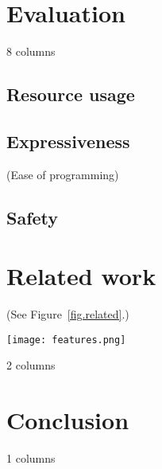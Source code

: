 \documentclass[10pt]{sensys-proc}
\newcommand{\CEU}{\textsc{C\'{e}u}\xspace}
\begin{document}
\newpage
\section{Evaluation}
\label{sec.eval}

8 columns

\subsection{Resource usage}


\subsection{Expressiveness} (Ease of programming)
\subsection{Safety}

\section{Related work}
\label{sec.related}

(See Figure~\ref{fig.related}.)

\begin{figure*}[t]
\texttt{[image: features.png]}
\caption{ Table of features found in related works of \CEU.
\label{fig.related}
}
\end{figure*}

2 columns

\section{Conclusion}
\label{sec.conclusion}


1 columns
\end{document}
